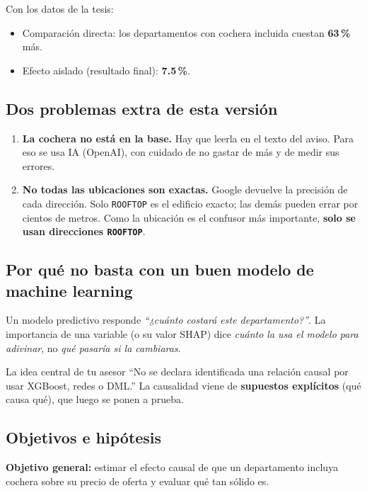 \documentclass[11pt,a4paper]{article}
\begin{document}
Con los datos de la tesis:
\begin{itemize}
\item Comparación directa: los departamentos con cochera incluida cuestan \textbf{63\,\%} más.
\item Efecto aislado (resultado final): \textbf{7.5\,\%}.
\end{itemize}

\subsection{Dos problemas extra de esta versión}

\begin{enumerate}
\item \textbf{La cochera no está en la base.} Hay que leerla en el texto del aviso. Para eso se usa IA (OpenAI), con cuidado de no gastar de más y de medir sus errores.
\item \textbf{No todas las ubicaciones son exactas.} Google devuelve la precisión de cada dirección. Solo \texttt{ROOFTOP} es el edificio exacto; las demás pueden errar por cientos de metros. Como la ubicación es el confusor más importante, \textbf{solo se usan direcciones \texttt{ROOFTOP}}.
\end{enumerate}

\subsection{Por qué no basta con un buen modelo de machine learning}

Un modelo predictivo responde \emph{``¿cuánto costará este departamento?''}. La importancia de una variable (o su valor SHAP) dice \emph{cuánto la usa el modelo para adivinar}, no \emph{qué pasaría si la cambiaras}.

\begin{ojo}{La idea central de tu asesor}
``No se declara identificada una relación causal por usar XGBoost, redes o DML.'' La causalidad viene de \textbf{supuestos explícitos} (qué causa qué), que luego se ponen a prueba.
\end{ojo}

\subsection{Objetivos e hipótesis}

\textbf{Objetivo general:} estimar el efecto causal de que un departamento incluya cochera sobre su precio de oferta y evaluar qué tan sólido es.
\end{document}
